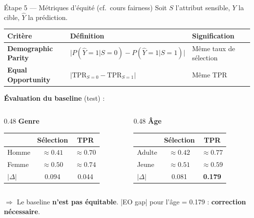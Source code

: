 \documentclass[aspectratio=169, 11pt]{beamer}
\begin{document}
\begin{frame}{\'Etape 5 --- M\'etriques d'\'equit\'e (cf.~cours fairness)}
Soit $S$ l'attribut sensible, $Y$ la cible, $\hat{Y}$ la pr\'ediction.

\vspace{0.5em}
\begin{tabular}{lll}
\toprule
\textbf{Crit\`ere} & \textbf{D\'efinition} & \textbf{Signification} \\
\midrule
\textbf{Demographic Parity} & $\big|P(\hat{Y}{=}1|S{=}0) - P(\hat{Y}{=}1|S{=}1)\big|$ & M\^eme taux de s\'election \\
\textbf{Equal Opportunity} & $\big|\text{TPR}_{S=0} - \text{TPR}_{S=1}\big|$ & M\^eme TPR \\
\bottomrule
\end{tabular}

\vspace{0.8em}
\textbf{\'Evaluation du baseline} (test) :

\vspace{0.3em}
\small
\begin{columns}[T]
\begin{column}{0.48\textwidth}
\centering\textbf{Genre}
\begin{tabular}{lcc}
\toprule
& S\'election & TPR \\
\midrule
Homme & $\approx 0.41$ & $\approx 0.70$ \\
Femme & $\approx 0.50$ & $\approx 0.74$ \\
$|\Delta|$ & 0.094 & 0.044 \\
\bottomrule
\end{tabular}
\end{column}
\begin{column}{0.48\textwidth}
\centering\textbf{\^Age}
\begin{tabular}{lcc}
\toprule
& S\'election & TPR \\
\midrule
Adulte & $\approx 0.42$ & $\approx 0.77$ \\
Jeune & $\approx 0.51$ & $\approx 0.59$ \\
$|\Delta|$ & 0.081 & \textbf{0.179} \\
\bottomrule
\end{tabular}
\end{column}
\end{columns}

\vspace{0.5em}
\normalsize
$\Rightarrow$ Le baseline \textbf{n'est pas \'equitable}. |EO gap| pour l'\^age = 0.179 : \textbf{correction n\'ecessaire}.
\end{frame}
\end{document}
